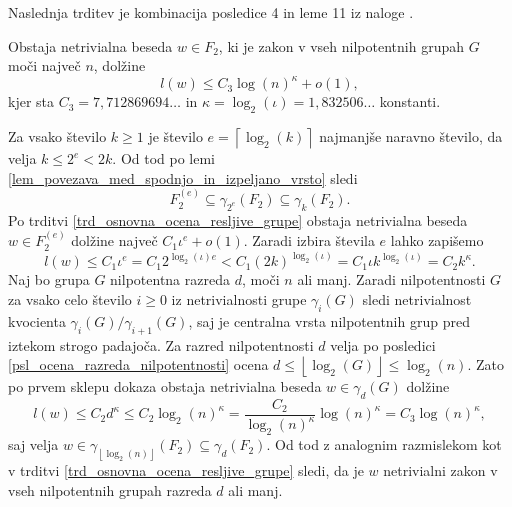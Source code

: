 Naslednja trditev je kombinacija posledice 4 in leme 11 iz naloge \cite[str.~16--17]{Schneider_2016}.

\begin{trditev}
\label{trd_koncna_ugotovitev_nilpotentne_v_nalogi}
 Obstaja netrivialna beseda $w \in F_2$, ki je zakon v vseh nilpotentnih grupah $G$ moči največ $n$, dolžine \begin{equation*}
 l(w) \le  C_3 \log(n)^{\kappa} + o(1),
 \end{equation*}  
 kjer sta $C_3 = 7{,}712869694 \ldots$ in $\kappa = \log_2(\iota) = 1{,}832506 \ldots$ konstanti.    
\end{trditev}

\begin{dokaz}
    Za vsako število $k \ge 1$ je
    število $e = \left\lceil \log_2(k) \right\rceil$ najmanjše naravno število, da velja $k \le 2^{e} < 2k$.
    Od tod po lemi \ref{lem_povezava_med_spodnjo_in_izpeljano_vrsto} sledi \begin{equation*}
    F_2^{(e)} \subseteq \gamma_{2^{e}}(F_2) \subseteq \gamma_k(F_2).
    \end{equation*}  
     Po trditvi \ref{trd_osnovna_ocena_resljive_grupe} obstaja netrivialna beseda $w \in  F_2^{(e)}$ dolžine največ $C_1 \iota^{e} + o(1)$.
    Zaradi izbira števila $e$ lahko zapišemo \begin{equation*}
    l(w) \le  C_1 \iota^{e} = C_1 2^{\log_2(\iota) e} < C_1 (2k)^{\log_2(\iota)} = C_1 \iota k^{\log_2(\iota)} = C_2  k^\kappa.
    \end{equation*}
    Naj bo grupa $G$ nilpotentna razreda $d$, moči $n$ ali manj. Zaradi nilpotentnosti $G$ za vsako celo število $i \ge 0$ iz netrivialnosti grupe $\gamma_i(G)$ sledi netrivialnost kvocienta $\gamma_i(G) / \gamma_{i + 1}(G)$, saj je centralna vrsta nilpotentnih grup pred iztekom strogo padajoča.
    Za razred nilpotentnosti $d$ velja po posledici \ref{psl_ocena_razreda_nilpotentnosti} ocena $d \le \left\lfloor \log_2(G)  \right\rfloor \le \log_2(n)$. Zato po prvem sklepu dokaza obstaja netrivialna beseda $w \in \gamma_d(G)$ dolžine \begin{equation*}
    l(w) \le C_2 d^{\kappa} \le C_2 \log_2(n)^{\kappa} = \frac{C_2}{\log_2(n)^{\kappa}} \log(n)^{\kappa} = C_3 \log(n)^{\kappa}, 
    \end{equation*}  
     saj velja $w \in \gamma_{\left\lfloor \log_2(n) \right\rfloor}(F_2) \subseteq \gamma_{d}(F_2)$. Od tod z analognim razmislekom kot v trditvi \ref{trd_osnovna_ocena_resljive_grupe} sledi, da je $w$ netrivialni zakon v vseh nilpotentnih grupah razreda $d$ ali manj. 
\end{dokaz}

